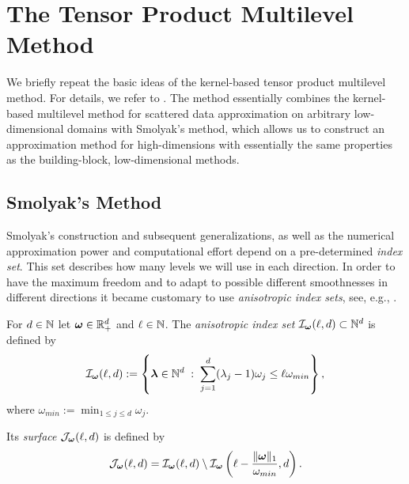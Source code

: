 \documentclass[	a4paper, 
								11pt]{article}
\theoremstyle{plain}
\begin{document}
%
%
%

\section{The Tensor Product Multilevel Method}\label{sec:TMPL}

We briefly repeat the basic ideas of the kernel-based tensor product multilevel method. For details, we refer to \cite{kempf:TPML}. The method essentially combines the kernel-based multilevel method for scattered data approximation on arbitrary low-dimensional domains with Smolyak's method, which allows us to construct an approximation method for high-dimensions with essentially the same properties as the building-block, low-dimensional methods.

\subsection{Smolyak's Method}

Smolyak's construction and subsequent generalizations, as well as the numerical approximation power and computational effort depend on a pre-determined 
\textit{index set}. This set describes how many levels we will use in each 
direction. In order to have the maximum freedom and to adapt to possible
different smoothnesses in different directions it became customary to use \textit{anisotropic index sets}, see, e.g., \cite{nobile:AnAnisotropocSparseGrid,
conrad:AdaptiveSmolyakPseudospectralApproximations,
hajiAli:NovelResultsAnisotropic,
wendlandRieger:AnisotropicSamplingInequalities}.

\begin{definition}
 For $ d \in \mathbb{N} $ let $ \boldsymbol{\omega} \in \mathbb{R}^d_+ $ and $ \ell \in \mathbb{N} $. The 
 \emph{anisotropic index set} $ \mathcal{I}_{\boldsymbol{\omega}}(\ell,d) \subset \mathbb{N}^d $ is 
 defined by 
 \begin{align}\label{eq:defAnisotropicIndexSet}
  \mathcal{I}_{\boldsymbol{\omega}}(\ell,d) := \left\{ \boldsymbol{\lambda} \in \mathbb{N}^d \; : \; \sum_{j=1}
  ^d (\lambda_j - 1) \omega_j \leq \ell \omega_{min} \right\},
 \end{align}
  where $ \omega_{min} := \min_{1 \leq j \leq d} \omega_j $.

 Its \emph{surface} $ \mathcal{J}_{\boldsymbol{\omega}}(\ell,d) $ is defined by
 \begin{align}\label{eq:defAnisotropicIndexSetSurface}
  \mathcal{J}_{\boldsymbol{\omega}}(\ell,d) = \mathcal{I}_{\boldsymbol{\omega}}(\ell,d) \setminus \mathcal{I}_{\boldsymbol{\omega}}
  \left(\ell - \frac{\| \boldsymbol{\omega} \|_1}{\omega_{min}}, d \right).
 \end{align}
\end{definition}
\end{document}
